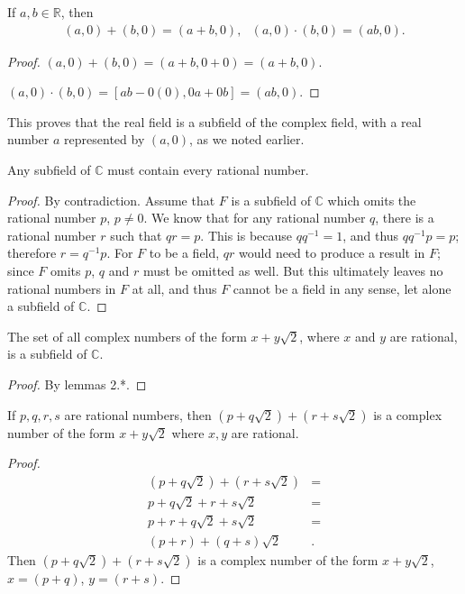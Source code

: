 \documentclass[12pt]{article}
\begin{document}
\begin{thm}
  If $a,b \in \mathbb{R}$, then
  \begin{align*}
    (a,0) + (b,0) = (a + b, 0),\ \ \ (a,0) \cdot (b,0) = (ab,0).
  \end{align*}

  \begin{proof}
    $(a,0) + (b,0) = (a+b,0+0) = (a+b,0)$.

    $(a,0) \cdot (b,0) = [ab - 0(0), 0a + 0b] = (ab,0)$.
  \end{proof}
\end{thm}

\begin{comm}
  This proves that the real field is a subfield of the complex field, with a real
  number $a$ represented by $(a,0)$, as we noted earlier.
\end{comm}

\begin{thm}
  Any subfield of $\mathbb{C}$ must contain every rational
  number.
  \begin{proof}
    By contradiction. Assume that $F$ is a subfield of
    $\mathbb{C}$ which omits the rational number $p$, $p \neq 0$.
    We know that for any rational number $q$, there is a rational
    number $r$ such that $qr = p$. This is because $qq^{-1} = 1$,
    and thus $qq^{-1}p = p$; therefore $r = q^{-1}p$. For $F$ to
    be a field, $qr$ would need to produce a result in $F$; since
    $F$ omits $p$, $q$ and $r$ must be omitted as well. But this
    ultimately leaves no rational numbers in $F$ at all, and thus
    $F$ cannot be a field in any sense, let alone a subfield of
    $\mathbb{C}$.
  \end{proof}
\end{thm}

\begin{thm}
  The set of all complex numbers of the form $x + y\sqrt{2}$,
  where $x$ and $y$ are rational, is a subfield of $\mathbb{C}$.

  \begin{proof}
    By lemmas 2.*.
  \end{proof}
\end{thm}

\begin{lemma}
  If $p,q,r,s$ are rational numbers, then $(p + q\sqrt{2}) + (r
  + s\sqrt{2})$ is a complex number of the form $x +
  y\sqrt{2}$ where $x, y$ are rational.
  \begin{proof}
    \begin{align*}
      (p + q\sqrt{2}) + (r + s\sqrt{2}) &=\\
      p + q\sqrt{2} + r + s\sqrt{2} &=\\
      p + r + q\sqrt{2} + s\sqrt{2} &=\\
      (p + r) + (q + s)\sqrt{2}&.
    \end{align*}
    Then $(p + q\sqrt{2}) + (r + s\sqrt{2})$ is a complex number
    of the form $x + y\sqrt{2}$, $x = (p + q)$, $y = (r + s)$.
  \end{proof}
\end{lemma}
\end{document}

